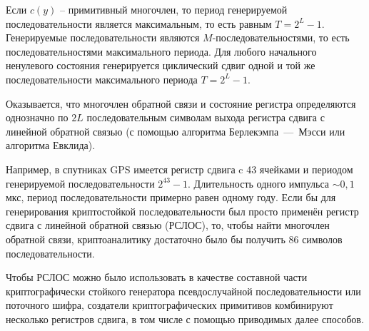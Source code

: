 Если $c(y)$ -- примитивный многочлен, то период генерируемой последовательности является максимальным, то есть равным $T = 2^{L} - 1$. Генерируемые последовательности являются $M$-последовательностями, то есть последовательностями максимального периода. Для любого начального ненулевого состояния генерируется циклический сдвиг одной и той же последовательности максимального периода $T=2^{L} - 1$.

Оказывается, что многочлен обратной связи и состояние регистра определяются однозначно по $2L$ последовательным символам выхода регистра сдвига с линейной обратной связью (с помощью алгоритма Берлекэмпа~---~Мэсси или алгоритма Евклида).

Например, в спутниках GPS имеется регистр сдвига c 43 ячейками и периодом генерируемой последовательности $2^{43} - 1$. Длительность одного импульса $\sim 0{,}1$ мкс, период последовательности примерно равен одному году. Если бы для генерирования криптостойкой последовательности был просто применён регистр сдвига с линейной обратной связью (РСЛОС), то, чтобы найти многочлен обратной связи, криптоаналитику достаточно было бы получить 86 символов последовательности.

Чтобы РСЛОС можно было использовать в качестве составной части криптографически стойкого генератора псевдослучайной последовательности или поточного шифра, создатели криптографических примитивов комбинируют несколько регистров сдвига, в том числе с помощью приводимых далее способов.
